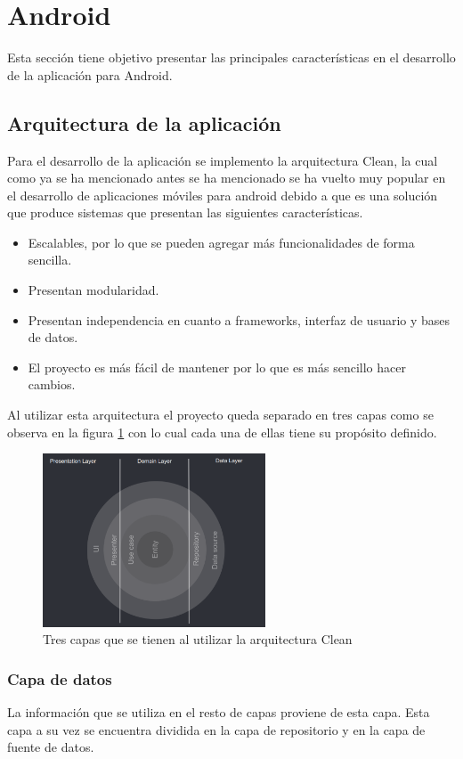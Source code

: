 \section{Android}
Esta sección tiene objetivo presentar las principales características en el desarrollo de la aplicación para Android.
\subsection{Arquitectura de la aplicación}
Para el desarrollo de la aplicación se implemento la arquitectura Clean, la cual como ya se ha mencionado antes se ha mencionado se ha vuelto muy popular en el desarrollo de aplicaciones móviles para android debido a que es una solución que produce sistemas que presentan las siguientes características.

\begin{itemize}
    \item Escalables, por lo que se pueden agregar más funcionalidades de forma sencilla.
    \item Presentan modularidad.
    \item Presentan independencia en cuanto a frameworks, interfaz de usuario y bases de datos.
    \item El proyecto es más fácil de mantener por lo que es más sencillo hacer cambios.
\end{itemize}

Al utilizar esta arquitectura el proyecto queda separado en tres capas como se observa en la figura \ref{fig:capas-arquitectura} con lo cual cada una de ellas tiene su propósito definido.

\begin{figure}[h]
    \centering
    \includegraphics[width=250px]{capitulo5/android/img/capas-clean.png}
    \caption{Tres capas que se tienen al utilizar la arquitectura Clean \cite{cleanGuide}}
    \label{fig:capas-arquitectura}
\end{figure}

\subsubsection{Capa de datos}
La información que se utiliza en el resto de capas proviene de esta capa. Esta capa a su vez se encuentra dividida en la capa de repositorio y en la capa de fuente de datos. 

